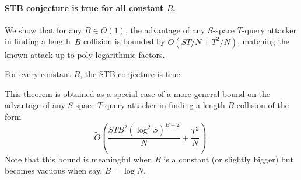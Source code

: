 \paragraph{STB conjecture is true for all constant $B$.}
We show that for any $B\in O(1)$, the advantage of any  $S$-space $T$-query attacker in finding a length~$B$ collision is bounded by
$\tilde O (ST/N + T^2/N)$, matching the known attack up to poly-logarithmic factors. 
\begin{theorem}
\label{thm:MDST_intro}
For every constant $B$, the STB conjecture is true.
\end{theorem}

This theorem is obtained as a special case of a more general bound on the advantage of any $S$-space $T$-query attacker in finding a length $B$ collision of the form
$$%
\tilde O\left(\frac{S T B^2 (\log^2 S)^{B-2}}{N} + \frac{T^2}{N}\right).
$$ %
Note that this bound is meaningful when $B$ is a constant (or slightly bigger) but becomes vacuous when say, $B= \log N$.

